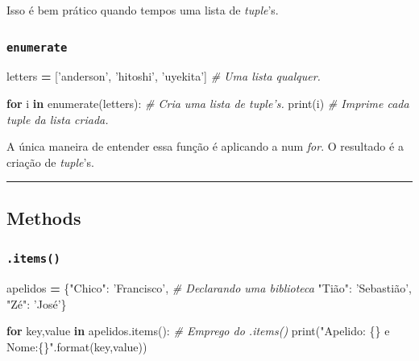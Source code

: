 \documentclass[]{book}
\newenvironment{Shaded}{\begin{snugshade}}{\end{snugshade}}
\newcommand{\KeywordTok}[1]{\textcolor[rgb]{0.13,0.29,0.53}{\textbf{#1}}}
\newcommand{\SpecialCharTok}[1]{\textcolor[rgb]{0.00,0.00,0.00}{#1}}
\newcommand{\StringTok}[1]{\textcolor[rgb]{0.31,0.60,0.02}{#1}}
\newcommand{\CommentTok}[1]{\textcolor[rgb]{0.56,0.35,0.01}{\textit{#1}}}
\newcommand{\ControlFlowTok}[1]{\textcolor[rgb]{0.13,0.29,0.53}{\textbf{#1}}}
\newcommand{\OperatorTok}[1]{\textcolor[rgb]{0.81,0.36,0.00}{\textbf{#1}}}
\newcommand{\BuiltInTok}[1]{#1}
\newcommand{\NormalTok}[1]{#1}
\begin{document}
Isso é bem prático quando tempos uma lista de \emph{tuple}'s.

\subsubsection{\texorpdfstring{\texttt{enumerate}}{enumerate}}\label{enumerate}

\begin{Shaded}
\begin{Highlighting}[]
\NormalTok{letters }\OperatorTok{=}\NormalTok{ [}\StringTok{'anderson'}\NormalTok{, }\StringTok{'hitoshi'}\NormalTok{, }\StringTok{'uyekita'}\NormalTok{]  }\CommentTok{# Uma lista qualquer.}

\ControlFlowTok{for}\NormalTok{ i }\KeywordTok{in} \BuiltInTok{enumerate}\NormalTok{(letters):                  }\CommentTok{# Cria uma lista de tuple's.}
    \BuiltInTok{print}\NormalTok{(i)                                  }\CommentTok{# Imprime cada tuple da lista criada.}
\end{Highlighting}
\end{Shaded}

A única maneira de entender essa função é aplicando a num \emph{for}. O
resultado é a criação de \emph{tuple}'s.

\begin{center}\rule{0.5\linewidth}{\linethickness}\end{center}

\subsection{Methods}\label{methods-1}

\subsubsection{\texorpdfstring{\texttt{.items()}}{.items()}}\label{items}

\begin{Shaded}
\begin{Highlighting}[]
\NormalTok{apelidos }\OperatorTok{=}\NormalTok{ \{}\StringTok{"Chico"}\NormalTok{: }\StringTok{'Francisco'}\NormalTok{,    }\CommentTok{# Declarando uma biblioteca}
            \StringTok{"Tião"}\NormalTok{: }\StringTok{'Sebastião'}\NormalTok{,}
            \StringTok{"Zé"}\NormalTok{: }\StringTok{'José'}\NormalTok{\}}

\ControlFlowTok{for}\NormalTok{ key,value }\KeywordTok{in}\NormalTok{ apelidos.items():   }\CommentTok{# Emprego do .items()}
    \BuiltInTok{print}\NormalTok{(}\StringTok{"Apelido: }\SpecialCharTok{\{\}}\StringTok{ e Nome:}\SpecialCharTok{\{\}}\StringTok{"}\NormalTok{.}\BuiltInTok{format}\NormalTok{(key,value))}
\end{Highlighting}
\end{Shaded}
\end{document}
